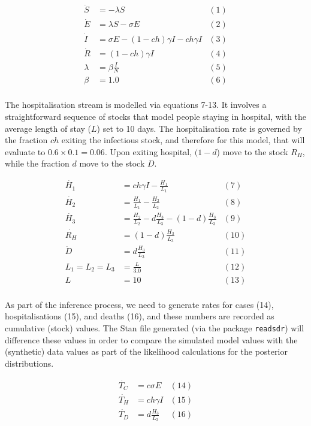 \documentclass[10pt,letterpaper]{article}
\begin{document}
\begin{align*}
\dot{S}      & = - \lambda S & (1) \\
\dot{E}      & =  \lambda S - \sigma E & (2) \\
\dot{I}      & =   \sigma E - (1-ch)\gamma I - ch\gamma I& (3) \\
\dot{R}      & =   (1-ch)\gamma I& (4) \\
\lambda      & = \beta\frac{I}{N} & (5) \\
\beta        & = 1.0 & (6) \\
\end{align*}

The hospitalisation stream is modelled via equations 7-13. It involves a straightforward sequence of stocks that model people staying in hospital, with the average length of stay (\(L\)) set to 10 days. The hospitalisation rate is governed by the fraction \(ch\) exiting the infectious stock, and therefore for this model, that will evaluate to \(0.6 \times 0.1=0.06\). Upon exiting hospital, \((1-d\)) move to the stock \(R_{H}\), while the fraction \(d\) move to the stock \(D\).

\begin{align*}
\dot{H_{1}}  & =   ch\gamma I - \frac{H_{1}}{L_{1}}& (7) \\
\dot{H_{2}}  & =   \frac{H_{1}}{L_{1}} - \frac{H_{2}}{L_{2}} & (8) \\
\dot{H_{3}}  & =   \frac{H_{2}}{L_{2}} - d\frac{H_{3}}{L_{3}} - (1-d)\frac{H_{3}}{L_{3}}& (9) \\
\dot{R_{H}}  & =   (1-d)\frac{H_{3}}{L_{3}}& (10) \\
\dot{D}      & =   d\frac{H_{3}}{L_{3}}   & (11) \\
L_{1} = L_{2} = L_{3}     & = \frac{L}{3.0} & (12) \\
L            & = 10 & (13) \\
\end{align*}

As part of the inference process, we need to generate rates for cases (14), hospitalisations (15), and deaths (16), and these numbers are recorded as cumulative (stock) values. The Stan file generated (via the package \texttt{readsdr}) will difference these values in order to compare the simulated model values with the (synthetic) data values as part of the likelihood calculations for the posterior distributions.

\begin{align*}
\dot{T_{C}}  & =  c\sigma E & (14) \\
\dot{T_{H}}  & =  ch\gamma I & (15) \\
\dot{T_{D}}  & =  d\frac{H_{3}}{L_{3}} &(16) \\
\end{align*}
\end{document}
